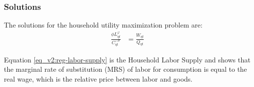 \documentclass[../thesis.tex]{subfiles}
\begin{document}
\begin{comment}
The first order conditions are:
\begin{align}
	C_{\eta t}: &\quad \beta^t \left\{ \frac{(1 -\sigma) C_{\eta t}^{-\sigma}}{1-\sigma} - \mu_{\eta t} \left[ Q_{\eta t} \right] \right\} = 0 \implies \nonumber \\
	&\quad \mu_{\eta t} = \frac{C_{\eta t}^{-\sigma}}{Q_{\eta t}} \label{eq_v2:reg-FOC-C-eta-t}
	\\
	L_{\eta t}: &\quad \beta^t \left\{ -\phi \frac{(1+\varphi) L_{\eta t}^{1 + \varphi}}{1 + \varphi} - \mu_{\eta t} \left[ -W_{\eta t} \right] \right\} = 0 \implies \nonumber \\
	&\quad \mu_{\eta t} = \frac{\phi L_{\eta t}^{\varphi}}{W_{\eta t}} \label{eq_v2:reg-FOC-Lt}
	\\
	K_{\eta,t+1}: &\quad \beta^t \{-\mu_{\eta t} [P_{\eta t}] \} + \mathbb{E}_{t} \beta^{t+1} \{ -\mu_{\eta,t+1} [-(P_{\eta,t+1} (1 - \delta) + R_{t+1})] \} = 0 \implies \nonumber \\
	&\quad \mu_{\eta t} P_{\eta t} = \beta \mathbb{E}_{t} \{ \mu_{\eta,t+1} [P_{\eta,t+1} (1 - \delta) + R_{t+1}] \} \label{eq_v2:reg-FOC-Kt}
	\\
	\mu_{\eta t}: &\quad Q_{\eta t} C_{\eta t} + P_{\eta t} (K_{\eta,t+1} - (1 - \delta) K_{\eta t}) = W_{\eta t} L_{\eta t} + R_{t} K_{\eta t} + \Pi_{\eta t} \tag{\ref{eq_v2:reg-budget-constraint-2}}
\end{align}

\end{comment}

\subsubsection*{Solutions}
The solutions for the household utility maximization problem are:
\begin{align}
	\frac{\phi L_{\eta t}^{\varphi}}{C_{\eta t}^{-\sigma}} &= \frac{W_{\eta t}}{Q_{\eta t}} \label{eq_v2:reg-labor-supply}
\end{align}

Equation \ref{eq_v2:reg-labor-supply} is the Household Labor Supply and shows that the marginal rate of substitution (MRS) of labor for consumption is equal to the real wage, which is the relative price between labor and goods.
\end{document}
